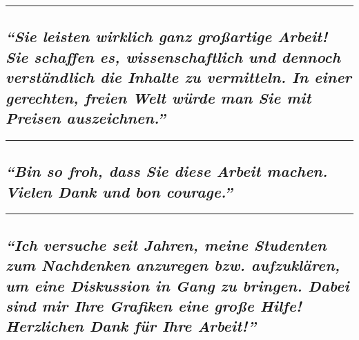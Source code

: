 \begin{center}\rule{0.5\linewidth}{\linethickness}\end{center}

\hypertarget{sie-leisten-wirklich-ganz-grouxdfartige-arbeit-sie-schaffen-es-wissenschaftlich-und-dennoch-verstuxe4ndlich-die-inhalte-zu-vermitteln-in-einer-gerechten-freien-welt-wuxfcrde-man-sie-mit-preisen-auszeichnen}{%
\subsection{\texorpdfstring{\emph{``Sie leisten wirklich ganz großartige
Arbeit! Sie schaffen es, wissenschaftlich und dennoch verständlich die
Inhalte zu vermitteln. In einer gerechten, freien Welt würde man Sie mit
Preisen
auszeichnen.''}}{``Sie leisten wirklich ganz großartige Arbeit! Sie schaffen es, wissenschaftlich und dennoch verständlich die Inhalte zu vermitteln. In einer gerechten, freien Welt würde man Sie mit Preisen auszeichnen.''}}\label{sie-leisten-wirklich-ganz-grouxdfartige-arbeit-sie-schaffen-es-wissenschaftlich-und-dennoch-verstuxe4ndlich-die-inhalte-zu-vermitteln-in-einer-gerechten-freien-welt-wuxfcrde-man-sie-mit-preisen-auszeichnen}}

\begin{center}\rule{0.5\linewidth}{\linethickness}\end{center}

\hypertarget{bin-so-froh-dass-sie-diese-arbeit-machen-vielen-dank-und-bon-courage}{%
\subsection{\texorpdfstring{\emph{``Bin so froh, dass Sie diese Arbeit
machen. Vielen Dank und bon
courage.''}}{``Bin so froh, dass Sie diese Arbeit machen. Vielen Dank und bon courage.''}}\label{bin-so-froh-dass-sie-diese-arbeit-machen-vielen-dank-und-bon-courage}}

\begin{center}\rule{0.5\linewidth}{\linethickness}\end{center}

\hypertarget{ich-versuche-seit-jahren-meine-studenten-zum-nachdenken-anzuregen-bzw-aufzukluxe4ren-um-eine-diskussion-in-gang-zu-bringen-dabei-sind-mir-ihre-grafiken-eine-grouxdfe-hilfe-herzlichen-dank-fuxfcr-ihre-arbeit}{%
\subsection{\texorpdfstring{\emph{``Ich versuche seit Jahren, meine
Studenten zum Nachdenken anzuregen bzw. aufzuklären, um eine Diskussion
in Gang zu bringen. Dabei sind mir Ihre Grafiken eine große Hilfe!
Herzlichen Dank für Ihre
Arbeit!''}}{``Ich versuche seit Jahren, meine Studenten zum Nachdenken anzuregen bzw. aufzuklären, um eine Diskussion in Gang zu bringen. Dabei sind mir Ihre Grafiken eine große Hilfe! Herzlichen Dank für Ihre Arbeit!''}}\label{ich-versuche-seit-jahren-meine-studenten-zum-nachdenken-anzuregen-bzw-aufzukluxe4ren-um-eine-diskussion-in-gang-zu-bringen-dabei-sind-mir-ihre-grafiken-eine-grouxdfe-hilfe-herzlichen-dank-fuxfcr-ihre-arbeit}}

